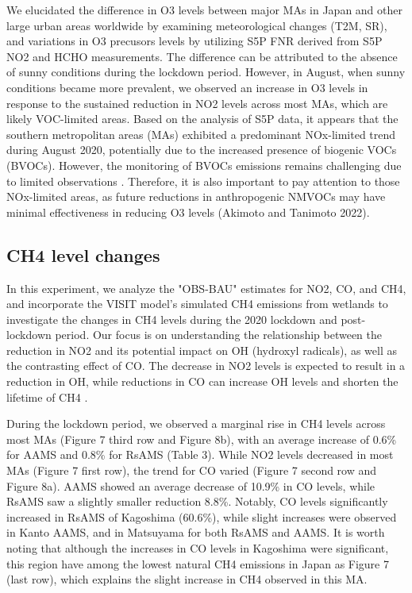 We elucidated the difference in O3 levels between major MAs in Japan and other large urban areas worldwide by examining meteorological changes (T2M, SR), and variations in O3 precusors levels by utilizing S5P FNR derived from S5P NO2 and HCHO measurements. The difference can be attributed to the absence of sunny conditions during the lockdown period. However, in August, when sunny conditions became more prevalent, we observed an increase in O3 levels in response to the sustained reduction in NO2 levels across most MAs, which are likely VOC-limited areas. Based on the analysis of S5P data, it appears that the southern metropolitan areas (MAs) exhibited a predominant NOx-limited trend during August 2020, potentially due to the increased presence of biogenic VOCs (BVOCs). However, the monitoring of BVOCs emissions remains challenging due to limited observations \citep{tani2021exchanges,ito2021terrestrial}. Therefore, it is also important to pay attention to those NOx-limited areas, as future reductions in anthropogenic NMVOCs may have minimal effectiveness in reducing O3 levels (Akimoto and Tanimoto 2022). \par

\subsection{CH4 level changes}
In this experiment, we analyze the "OBS-BAU" estimates for NO2, CO, and CH4, and incorporate the VISIT model's simulated CH4 emissions from wetlands to investigate the changes in CH4 levels during the 2020 lockdown and post-lockdown period. Our focus is on understanding the relationship between the reduction in NO2 and its potential impact on OH (hydroxyl radicals), as well as the contrasting effect of CO. The decrease in NO2 levels is expected to result in a reduction in OH, while reductions in CO can increase OH levels and shorten the lifetime of CH4 \citep{akimoto2022rethinking}.\par
During the lockdown period, we observed a marginal rise in CH4 levels across most MAs (Figure 7 third row and Figure 8b), with an average increase of 0.6\% for AAMS and 0.8\% for RsAMS (Table 3). While NO2 levels decreased in most MAs (Figure 7 first row), the trend for CO varied (Figure 7 second row and Figure 8a). AAMS showed an average decrease of 10.9\% in CO levels, while RsAMS saw a slightly smaller reduction 8.8\%. Notably, CO levels significantly increased in RsAMS of Kagoshima (60.6\%), while slight increases were observed in Kanto AAMS, and in Matsuyama for both RsAMS and AAMS. It is worth noting that although the increases in CO levels in Kagoshima were significant, this region have among the lowest natural CH4 emissions in Japan as Figure 7 (last row), which explains the slight increase in CH4 observed in this MA.\par


